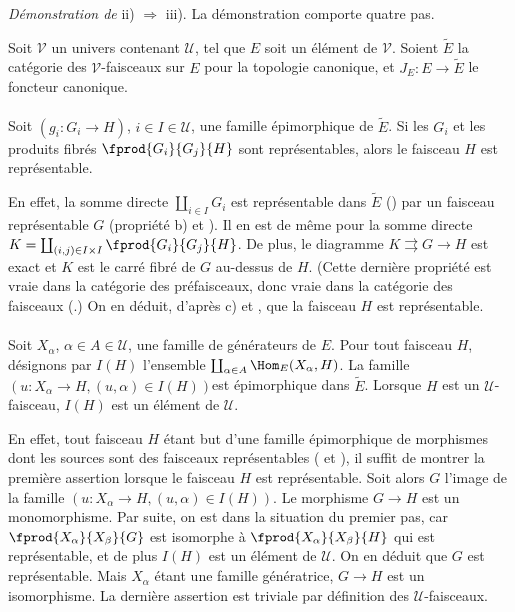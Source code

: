 \documentclass[10pt]{../fichiers-configuration-latex/smfart}
\begin{document}
\subsubsection{}
\emph{Démonstration de} ii) $\Rightarrow$ iii). La démonstration
comporte quatre pas.

Soit $𝒱$ un univers contenant $𝒰$, tel que $E$ soit
un élément de $𝒱$. Soient $\widetilde{E}$ la catégorie
des $𝒱$-faisceaux sur $E$ pour la topologie canonique, et
$J_E:E\rightarrow \widetilde{E}$ le foncteur canonique.

\paragraph{}
Soit $(g_i:G_i\rightarrow H)$, $i\in I\in 𝒰$, une famille
épimorphique de $\widetilde{E}$. Si les $G_i$ et les produits
fibrés $\fprod{G_i}{G_j}{H}$ sont représentables, alors le
faisceau $H$ est représentable.

En effet, la somme directe $\coprod_{i\in I}G_i$ est représentable
dans $\widetilde{E}$ () par un faisceau
représentable $G$ (propriété b) et ). Il en
est de même pour la somme directe $K=\coprod_{(i,j)\in I\times
I}\fprod{G_i}{G_j}{H}$. De plus, le diagramme $K\rightrightarrows
G\rightarrow H$ est exact et $K$ est le carré fibré de $G$
au-dessus de $H$. (Cette dernière propriété est vraie dans la
catégorie des préfaisceaux, donc vraie dans la catégorie des
faisceaux (.) On en déduit, d'après c) et
, que la faisceau $H$ est représentable.

\paragraph{}
Soit $X_{\alpha}$, $\alpha\in A\in 𝒰$, une famille de
générateurs de $E$. Pour tout faisceau $H$, désignons par
$I(H)$ l'ensemble $\coprod_{\alpha \in A}\Hom_E (X_{\alpha}, H)$. La
famille $(u:X_{\alpha}\rightarrow H, (u,\alpha)\in
I(H))$\pageoriginale est épimorphique dans $\widetilde{E}$.
Lorsque $H$ est un $𝒰$-faisceau, $I(H)$ est un élément
de $𝒰$.

En effet, tout faisceau $H$ étant but d'une famille épimorphique de
morphismes dont les sources sont des faisceaux représentables (
 et ), il suffit de montrer la
première assertion lorsque le faisceau $H$ est représentable. Soit
alors $G$ l'image de la famille $(u:X_{\alpha}\rightarrow H,
(u,\alpha)\in I(H))$. Le morphisme $G\rightarrow H$ est un
monomorphisme. Par suite, on est dans la situation du premier pas,
car $\fprod{X_{\alpha}}{X_{\beta}}{G}$ est isomorphe à
$\fprod{X_{\alpha}}{X_{\beta}}{H}$ qui est représentable, et de plus
$I(H)$ est un élément de $𝒰$. On en déduit que $G$ est
représentable. Mais $X_{\alpha}$ étant une famille génératrice,
$G\rightarrow H$ est un isomorphisme. La dernière assertion est
triviale par définition des $𝒰$-faisceaux.
\end{document}
